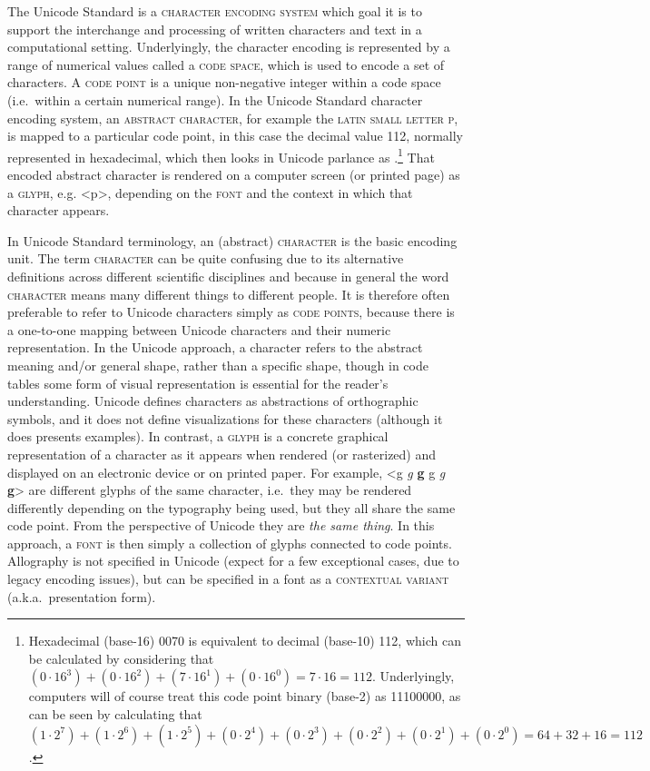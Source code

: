 The Unicode Standard is a \textsc{character encoding system} which
goal it is to support the interchange and processing of written characters and
text in a computational setting. Underlyingly, the character encoding is
represented by a range of numerical values called a \textsc{code space}, which
is used to encode a set of characters. A \textsc{code point} is a unique
non-negative integer within a code space (i.e.~within a certain numerical
range). In the Unicode Standard character encoding system, an \textsc{abstract
character}, for example the \textsc{latin small letter p}, is mapped to a
particular code point, in this case the decimal value 112, normally represented in
hexadecimal, which then looks in Unicode parlance as
.\footnote{Hexadecimal (base-16) 0070 is equivalent to decimal
(base-10) 112, which can be calculated by considering that $(0\cdot16^3) +
(0\cdot16^2) + (7\cdot16^1) + (0\cdot16^0) = 7\cdot16 = 112$. Underlyingly,
computers will of course treat this code point binary (base-2) as 11100000, as
can be seen by calculating that $(1\cdot2^7) + (1\cdot2^6) + (1\cdot2^5) +
(0\cdot2^4) + (0\cdot2^3) + (0\cdot2^2) + (0\cdot2^1) + (0\cdot2^0) = 64 + 32 +
16 = 112$.} That encoded abstract character is rendered on a computer screen (or
printed page) as a \textsc{glyph}, e.g. <p>, depending on the \textsc{font} and
the context in which that character appears.

In Unicode Standard terminology, an (abstract) \textsc{character} is the basic
encoding unit. The term \textsc{character} can be quite confusing due to its
alternative definitions across different scientific disciplines and because in
general the word \textsc{character} means many different things to different
people. It is therefore often preferable to refer to Unicode characters simply
as \textsc{code points}, because there is a one-to-one mapping between Unicode
characters and their numeric representation. In the Unicode approach, a
character refers to the abstract meaning and/or general shape, rather than a
specific shape, though in code tables some form of visual representation is
essential for the reader's understanding. Unicode defines characters as
abstractions of orthographic symbols, and it does not define visualizations for
these characters (although it does presents examples). In contrast, a
\textsc{glyph} is a concrete graphical representation of a character as it
appears when rendered (or rasterized) and displayed on an electronic device or
on printed paper. For example, <g {\large \textit{g}} \textbf{g}
{ {\small g} \textit{g} \textbf{g}}> are different glyphs of the
same character, i.e.~they may be rendered differently depending on the
typography being used, but they all share the same code point. From the
perspective of Unicode they are \textit{the same thing}. In this approach, a
\textsc{font} is then simply a collection of glyphs connected to code points.
Allography is not specified in Unicode (expect for a few exceptional cases, due
to legacy encoding issues), but can be specified in a font as a
\textsc{contextual variant} (a.k.a.~presentation form).

